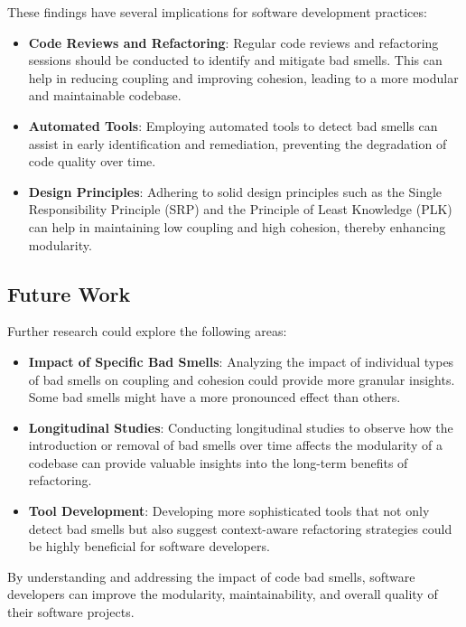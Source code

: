 \documentclass[conference]{IEEEtran}
\begin{document}
These findings have several implications for software development practices:

\begin{itemize}
    \item \textbf{Code Reviews and Refactoring}: Regular code reviews and refactoring sessions should be conducted to identify and mitigate bad smells. This can help in reducing coupling and improving cohesion, leading to a more modular and maintainable codebase.
    
    \item \textbf{Automated Tools}: Employing automated tools to detect bad smells can assist in early identification and remediation, preventing the degradation of code quality over time.
    
    \item \textbf{Design Principles}: Adhering to solid design principles such as the Single Responsibility Principle (SRP) and the Principle of Least Knowledge (PLK) can help in maintaining low coupling and high cohesion, thereby enhancing modularity.
\end{itemize}

\subsection{Future Work}

Further research could explore the following areas:

\begin{itemize}
    \item \textbf{Impact of Specific Bad Smells}: Analyzing the impact of individual types of bad smells on coupling and cohesion could provide more granular insights. Some bad smells might have a more pronounced effect than others.
    
    \item \textbf{Longitudinal Studies}: Conducting longitudinal studies to observe how the introduction or removal of bad smells over time affects the modularity of a codebase can provide valuable insights into the long-term benefits of refactoring.
    
    \item \textbf{Tool Development}: Developing more sophisticated tools that not only detect bad smells but also suggest context-aware refactoring strategies could be highly beneficial for software developers.
\end{itemize}

By understanding and addressing the impact of code bad smells, software developers can improve the modularity, maintainability, and overall quality of their software projects.
	
\end{document}
